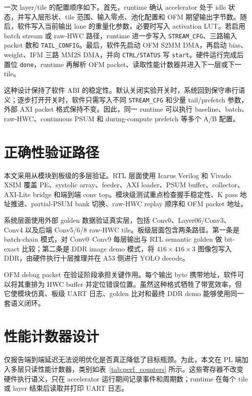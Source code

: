 一次 layer/tile 的配置顺序如下。首先，runtime 确认 accelerator 处于 idle 状态，并写入层形状、tile 范围、输入零点、池化配置和 OFM 期望输出字节数。随后，软件写入当前输出 lane 的重量化参数，必要时写入 activation LUT。若启用 batch stream 或 raw-HWC 路径，runtime 进一步写入 \texttt{STREAM\_CFG}、三路输入 packet 数和 \texttt{TAIL\_CONFIG}。最后，软件先启动 OFM S2MM DMA，再启动 bias、weight、IFM 三路 MM2S DMA，并向 \texttt{CTRL/STATUS} 写 \texttt{start}。硬件运行完成后置位 \texttt{done}，runtime 再解析 OFM packet、读取性能计数器并进入下一层或下一 tile。

这种设计保持了软件 ABI 的稳定性。默认关闭实验开关时，系统回到保守串行语义；逐步打开开关时，软件只需写入不同 \texttt{STREAM\_CFG} 和少量 tail/prefetch 参数，外部 AXI packet 格式保持不变。因此，同一 runtime 可以执行 baseline、batch、raw-HWC、continuous PSUM 和 during-compute prefetch 等多个 A/B 配置。

\section{正确性验证路径}

本文采用从模块到板级的多层验证。RTL 层面使用 Icarus Verilog 和 Vivado XSIM 覆盖 PE、systolic array、feeder、AXI loader、PSUM buffer、collector、AXI-Lite bridge 和端到端 conv top。模块级测试重点检查握手稳定性、K pass 地址推进、partial-PSUM bank 切换、raw-HWC replay 顺序和 OFM packet 地址。

系统层面使用外部 golden 数据验证真实层，包括 Conv0、Layer06/Conv3、Conv4 以及后端 Conv5/6/8 raw-HWC tile。板级层面包含两条路径。第一条是 batch-chain 模式，对 Conv0--Conv9 每层输出与 RTL semantic golden 做 bit-exact 比较；第二条是 DDR image demo 模式，将 $416\times416\times3$ 图像包写入 DDR，由硬件执行十层推理并在 A53 侧进行 YOLO decode。

OFM debug packet 在验证阶段承担关键作用。每个输出 byte 携带地址，软件可以将其重排为 HWC buffer 并定位错误位置。虽然这种格式牺牲了带宽效率，但它使模块仿真、板级 UART 日志、golden 比对和最终 DDR demo 能够使用同一套语义闭环。

\section{性能计数器设计}

仅报告端到端延迟无法说明优化是否真正降低了目标瓶颈。为此，本文在 PL 端加入多层只读性能计数器，类别如表~\ref{tab:perf_counters} 所示。这些寄存器不改变硬件执行语义，只在 accelerator 运行期间记录事件和周期数；runtime 在每个 tile 或 layer 结束后读取并打印 UART 日志。

